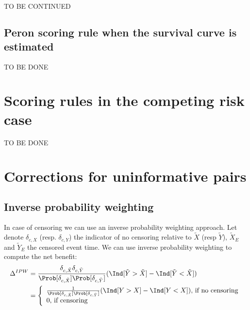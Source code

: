 \documentclass[12pt]{article}
\begin{document}
TO BE CONTINUED

\subsection{Peron scoring rule when the survival curve is estimated}
\label{sec:orga5719e2}

TO BE DONE

\section{Scoring rules in the competing risk case}
\label{sec:org203e292}
TO BE DONE

\clearpage

\section{Corrections for uninformative pairs}
\label{sec:org6505fcb}
\subsection{Inverse probability weighting}
\label{sec:org8bcacc2}

In case of censoring we can use an inverse probability weighting
approach. Let denote \(\delta_{c,X}\) (resp. \(\delta_{c,Y}\)) the
indicator of no censoring relative to \(\tilde{X}\) (resp \(\tilde{Y}\)), \(\tilde{X}_E\) and \(\tilde{Y}_E\) the
censored event time. We can use inverse probability weighting to
compute the net benefit:
\begin{align*}
\Delta^{IPW} &= \frac{\delta_{c,\tilde{X}}\delta_{c,\tilde{Y}}}{\Prob[\delta_{c,\tilde{X}}]\Prob[\delta_{c,\tilde{Y}}]} (\Ind[\tilde{Y}>\tilde{X}]-\Ind[\tilde{Y}<\tilde{X}])\\
&= \left\{
                \begin{array}{ll}
                  \frac{1}{\Prob[\delta_{c,\tilde{X}}]\Prob[\delta_{c,\tilde{Y}}]} (\Ind[Y>X]-\Ind[Y<X])\text{, if no censoring}\\
                  0\text{, if censoring}
                \end{array}
              \right.
\end{align*}
\end{document}
